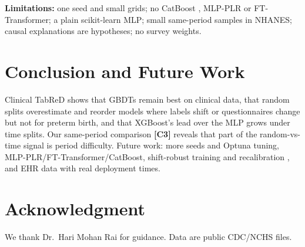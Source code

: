 \documentclass[journal,twoside,web]{ieeecolor}
\DeclareRobustCommand{\contrib}[1]{\textbf{\textcolor{contribframe}{[C#1]}}}
\begin{document}
\textbf{Limitations:} one seed and small grids; no CatBoost \cite{prokhorenkova2018catboost},
MLP-PLR or FT-Transformer; a plain scikit-learn MLP; small same-period samples in NHANES; causal
explanations are hypotheses; no survey weights.

\section{Conclusion and Future Work}
\label{sec:conclusion}
Clinical TabReD shows that GBDTs remain best on clinical data, that random splits overestimate and
reorder models where labels shift or questionnaires change but not for preterm birth, and that
XGBoost's lead over the MLP grows under time splits. Our same-period comparison \contrib{3} reveals
that part of the random-vs-time signal is period difficulty. Future work: more seeds and Optuna
tuning, MLP-PLR/FT-Transformer/CatBoost, shift-robust training and recalibration
\cite{lipton2018detecting}, and EHR data with real deployment times.

\section*{Acknowledgment}
We thank Dr.~Hari Mohan Rai for guidance. Data are public CDC/NCHS files.



\end{document}

